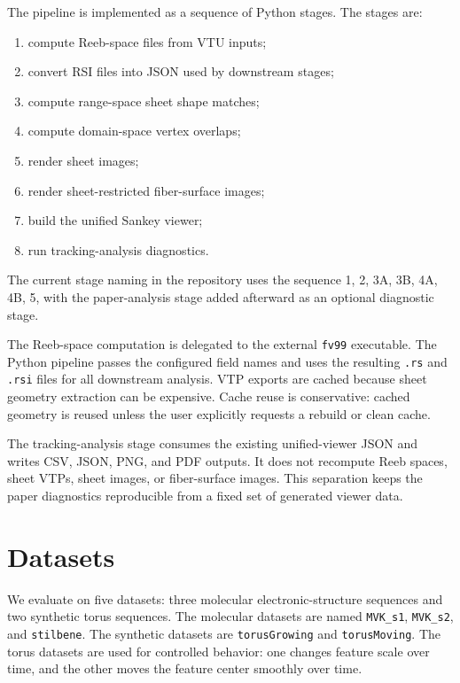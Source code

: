 The pipeline is implemented as a sequence of Python stages. The stages are:
\begin{enumerate}
  \item compute Reeb-space files from VTU inputs;
  \item convert RSI files into JSON used by downstream stages;
  \item compute range-space sheet shape matches;
  \item compute domain-space vertex overlaps;
  \item render sheet images;
  \item render sheet-restricted fiber-surface images;
  \item build the unified Sankey viewer;
  \item run tracking-analysis diagnostics.
\end{enumerate}
The current stage naming in the repository uses the sequence
1, 2, 3A, 3B, 4A, 4B, 5, with the paper-analysis stage added afterward as an
optional diagnostic stage.

The Reeb-space computation is delegated to the external \texttt{fv99}
executable. The Python pipeline passes the configured field names and uses the
resulting \texttt{.rs} and \texttt{.rsi} files for all downstream analysis. VTP
exports are cached because sheet geometry extraction can be expensive. Cache
reuse is conservative: cached geometry is reused unless the user explicitly
requests a rebuild or clean cache.

The tracking-analysis stage consumes the existing unified-viewer JSON and
writes CSV, JSON, PNG, and PDF outputs. It does not recompute Reeb spaces,
sheet VTPs, sheet images, or fiber-surface images. This separation keeps the
paper diagnostics reproducible from a fixed set of generated viewer data.

\section{Datasets}

We evaluate on five datasets: three molecular electronic-structure sequences
and two synthetic torus sequences. The molecular datasets are named
\texttt{MVK\_s1}, \texttt{MVK\_s2}, and \texttt{stilbene}. The synthetic
datasets are \texttt{torusGrowing} and \texttt{torusMoving}. The torus datasets
are used for controlled behavior: one changes feature scale over time, and the
other moves the feature center smoothly over time.

